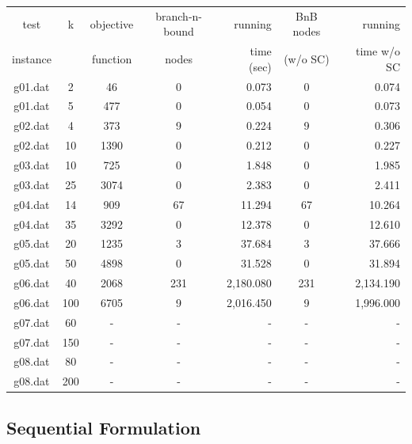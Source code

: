 \documentclass[,%
			paper=a4,%
			DIV14,
			liststotoc,
			bibtotoc,
			draft=false,%
			numbers=noendperiod
			]{scrartcl}
\begin{document}
\begin{tabular}{||c||cccr|cr||}
\hline
test     & k & objective  & branch-n-bound & running   & BnB nodes & running\\
instance &   & function   & nodes          & time (sec)& (w/o SC)  & time w/o SC \\
\hline

g01.dat	&	2	&	46	&	0	&	0.073	&	0	&	0.074	\\
g01.dat	&	5	&	477	&	0	&	0.054	&	0	&	0.073	\\
g02.dat	&	4	&	373	&	9	&	0.224	&	9	&	0.306	\\
g02.dat	&	10	&	1390	&	0	&	0.212	&	0	&	0.227	\\
g03.dat	&	10	&	725	&	0	&	1.848	&	0	&	1.985	\\
g03.dat	&	25	&	3074	&	0	&	2.383	&	0	&	2.411	\\
g04.dat	&	14	&	909	&	67	&	11.294	&	67	&	10.264	\\
g04.dat	&	35	&	3292	&	0	&	12.378	&	0	&	12.610	\\
g05.dat	&	20	&	1235	&	3	&	37.684	&	3	&	37.666	\\
g05.dat	&	50	&	4898	&	0	&	31.528	&	0	&	31.894	\\
g06.dat	&	40	&	2068	&	231	&	2,180.080	&	231	&	2,134.190	\\
g06.dat	&	100	&	6705	&	9	&	2,016.450	&	9	&	1,996.000	\\
g07.dat	&	60	&	-	&	-	&	-	&	-	&	-	\\
g07.dat	&	150	&	-	&	-	&	-	&	-	&	-	\\
g08.dat	&	80	&	-	&	-	&	-	&	-	&	-	\\
g08.dat	&	200	&	-	&	-	&	-	&	-	&	-	\\

\hline
\end{tabular}


\subsection{Sequential Formulation}
\end{document}
